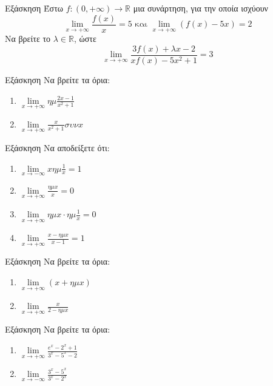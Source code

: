 \documentclass[greek]{beamer}
\begin{document}
\begin{frame}{Εξάσκηση}
 Έστω $f:(0,+\infty)\to\mathbb{R}$ μια συνάρτηση, για την οποία ισχύουν
 $$\lim\limits_{x \to +\infty}{ \frac{f(x)}{x} }=5 \text{ και } \lim\limits_{x \to +\infty}{ (f(x)-5x) }=2$$
 Να βρείτε το $λ\in\mathbb{R}$, ώστε
 $$\lim\limits_{x \to +\infty}{ \frac{3f(x)+λx-2}{xf(x)-5x^2+1} }=3$$
\end{frame}

\begin{frame}{Εξάσκηση}
 Να βρείτε τα όρια:
 \begin{enumerate}
  \item $\lim\limits_{x \to +\infty}{ ημ\frac{2x-1}{x^2+1} }$ \pause
  \item $\lim\limits_{x \to +\infty}{ \frac{x}{x^2+1}συνx  }$
 \end{enumerate}
\end{frame}

\begin{frame}{Εξάσκηση}
 Να αποδείξετε ότι:
 \begin{enumerate}
  \item $\lim\limits_{x \to -\infty}{ xημ\frac{1}{x} }=1$ \pause
  \item $\lim\limits_{x \to +\infty}{ \frac{ημx}{x}  }=0$  \pause
  \item $\lim\limits_{x \to +\infty}{ ημx\cdot ημ\frac{1}{x}  }=0$  \pause
  \item $\lim\limits_{x \to +\infty}{ \frac{x-ημx}{x-1}  }=1$
 \end{enumerate}
\end{frame}

\begin{frame}{Εξάσκηση}
 Να βρείτε τα όρια:
 \begin{enumerate}
  \item $\lim\limits_{x \to +\infty}{ (x+ημx) }$ \pause
  \item $\lim\limits_{x \to +\infty}{ \frac{x}{2-ημx}  }$
 \end{enumerate}
\end{frame}

\begin{frame}{Εξάσκηση}
 Να βρείτε τα όρια:
 \begin{enumerate}
  \item $\lim\limits_{x \to +\infty}{ \frac{e^x-2^x+1}{3^x-5^x-2} }$ \pause
  \item $\lim\limits_{x \to -\infty}{ \frac{3^x-5^x}{3^x-2^x}  }$
 \end{enumerate}
\end{frame}
\end{document}

